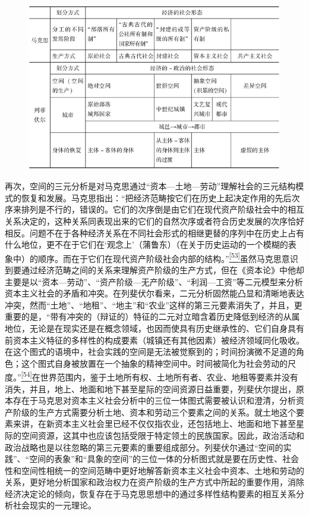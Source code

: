 \documentclass[UTF8, fontset = sourcesans, a4paper, oneside, zihao =
-4, scheme=chinese, no-math, space=true]{ctexbook}
\makeatletter
\def\maxwidth{\ifdim\Gin@nat@width>\linewidth\linewidth
\else\Gin@nat@width\fi}
\let\Oldincludegraphics\includegraphics
\renewcommand{\includegraphics}[1]{\Oldincludegraphics[width=\maxwidth]{#1}}
\makeatother
\begin{document}
\begin{figure}[!htbp]
  \centering
\includegraphics{images/00004.jpeg}
\end{figure}

再次，空间的三元分析是对马克思通过``资本---土地---劳动''理解社会的三元结构模式的恢复和发展。马克思指出：``把经济范畴按它们在历史上起决定作用的先后次序来排列是不行的，错误的。它们的次序倒是由它们在现代资产阶级社会中的相互关系决定的，这种关系同表现出来的它们的自然次序或者符合历史发展的次序恰好相反。问题不在于各种经济关系在不同社会形式的相继更替的序列中在历史上占有什么地位，更不在于它们在`观念上'（蒲鲁东）（在关于历史运动的一个模糊的表象中）的顺序。而在于它们在现代资产阶级社会内部的结构。''\protect\hypertarget{part0010_split_002.htmlux5cux23w53}{}{}\protect\hyperlink{part0010_split_002.htmlux5cux23m53}{\textsuperscript{{[}53{]}}}虽然马克思意识到要通过经济范畴之间的关系来理解资产阶级的生产方式，但在《资本论》中他却主要是以``资本---劳动''、``资产阶级---无产阶级''、``利润---工资''等二元模型来分析资本主义社会的矛盾和冲突。在列斐伏尔看来，二元分析固然能凸显和清晰地表达冲突，然而``土地''、``地租''、``地主''和``农业''这样的第三元要素消失了，并且，更重要的是，``带有冲突的（辩证的）特征的二元对立暗含着历史降低到经济的从属地位，无论是在现实还是在概念领域，也因而使具有历史继承性的、它们自身具有前资本主义特征的多样性的构成要素（城镇还有其他因素）被经济领域同化吸收。在这个图式的语境中，社会实践的空间是无法被觉察到的；时间扮演微不足道的角色；这个图式自身被放置在一个抽象的精神空间中。时间被简化为社会劳动的尺度。''\protect\hypertarget{part0010_split_002.htmlux5cux23w54}{}{}\protect\hyperlink{part0010_split_002.htmlux5cux23m54}{\textsuperscript{{[}54{]}}}在世界范围内，鉴于土地所有权、土地所有者、农业、地租等要素并没有消失，并且，地上、地面和地下甚至星际的空间资源日益重要，列斐伏尔提出，原本存在于马克思对资本主义社会分析中的三位一体图式需要被认识和澄清，分析资产阶级的生产方式需要分析土地、资本和劳动三个要素之间的关系。就土地这个要素来讲，在新资本主义社会里已经不仅仅指农业，还包括地上、地面和地下甚至星际的空间资源，这其中也应该包括受限于特定领土的民族国家。因此，政治活动和政治战略也是以往忽略的第三元要素的重要组成部分。列斐伏尔通过``空间的实践''、``空间的表象''和``具象的空间''的三位一体的分析图式就是要在历史性、社会性和空间性相统一的空间范畴中更好地解答新资本主义社会中资本、土地和劳动的关系，更好地分析国家和政治权力在资产阶级的生产方式中所起的重要作用，消除经济决定论的倾向，恢复存在于马克思思想中的通过多样性结构要素的相互关系分析社会现实的一元理论。
\end{document}
